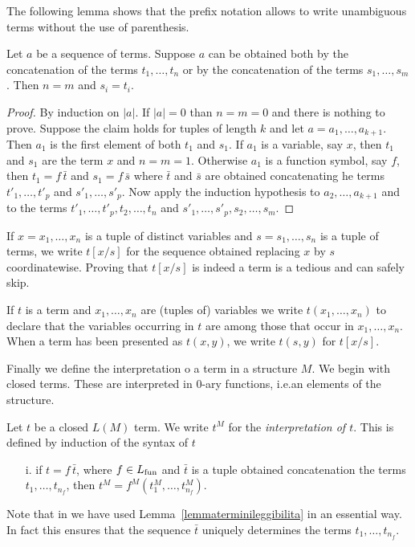 The following lemma shows that the prefix notation allows to write unambiguous terms without the use of parenthesis.


\begin{lemma}\label{lemmaterminileggibilita}
Let $a$ be a sequence of terms. Suppose $a$ can be obtained both by the concatenation of the terms $t_1,\dots,t_n$ or by the concatenation of the terms $s_1,\dots,s_m$. Then $n=m$ and $s_i=t_i$.
\end{lemma}
\begin{proof}
By induction on $|a|$. If $|a|=0$ than $n=m=0$ and there is nothing to prove. Suppose the claim holds for tuples of length $k$ and let $a=a_1,\dots,a_{k+1}$. Then $a_1$ is the first element of both  $t_1$ and $s_1$. If $a_1$ is a variable, say $x$, then $t_1$ and $s_1$ are the term $x$ and $n=m=1$. Otherwise $a_1$ is a function symbol, say $f$, then $t_1=f\,\bar t$ and $s_1=f\,\bar s$ where $\bar t$ and $\bar s$ are obtained concatenating he terms $t'_1, \dots, t'_p$ and $s'_1, \dots, s'_p$.  Now apply the induction hypothesis to $a_2,\dots,a_{k+1}$ and to the terms $t'_1, \dots,t'_p,t_2,\dots,t_n$ and $s'_1,\dots,s'_p,s_2,\dots,s_m$.
\end{proof}

If $x=x_1,\dots,x_n$ is a tuple of distinct variables and $s=s_1,\dots,s_n$ is a tuple of terms, we write \emph{$t[x/s]$\/} for the sequence obtained replacing $x$ by $s$ coordinatewise. Proving that $t[x/s]$ is indeed a term is a tedious and can safely skip.

If $t$ is a term and $x_1,\dots,x_n$ are (tuples of) variables we write \emph{$t(x_1,\dots,x_n)$\/} to declare that the variables occurring in $t$ are among those that occur in $x_1,\dots,x_n$. When a term has been presented as $t(x,y)$, we write \emph{$t(s,y)$\/} for $t[x/s]$.

Finally we define the interpretation o a term in a structure $M$. We begin with closed terms. These are interpreted in $0$-ary functions, i.e.\@ an elements of the structure.

\begin{definition}\label{defterminiinterpretazione}
Let $t$ be a closed $L(M)$ term. We write \emph{$t^M$} for the \emph{interpretation of $t$}. This is defined by induction of the syntax of $t$

\begin{itemize}
\item[i.] if $t=f\,\bar t$, where $f\in L_{\rm fun}$ and $\bar t$ is a tuple obtained concatenation the terms $t_1,\dots,t_{n_f}$, then $t^M=f^M(t^M_1, \dots, t^M_{n_f})$.
\end{itemize}
Note that in  we have used Lemma~\ref{lemmaterminileggibilita} in an essential way. In fact this ensures that the sequence $\bar t$ uniquely determines the terms $t_1, \dots, t_{n_f}$.\QED
\end{definition}


